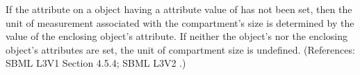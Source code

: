 If the attribute  on a \Compartment object having a
 attribute value of  has not been set, then
the unit of measurement associated with the compartment's size is
determined by the value of the enclosing \Model object's
 attribute.  If neither the \Compartment object's
 nor the enclosing \Model object's 
attributes are set, the unit of compartment size is undefined.
(References: SBML L3V1 Section 4.5.4; SBML L3V2 .)
